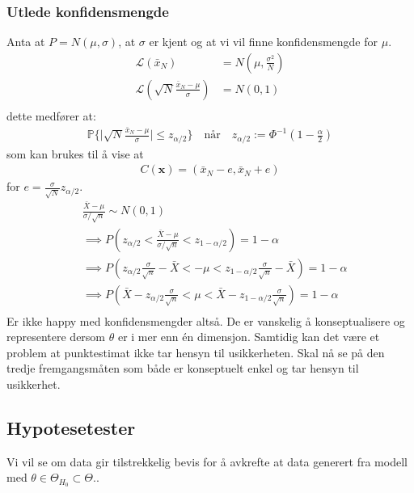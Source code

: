 \subsubsection{Utlede konfidensmengde}
Anta at $P=N(\mu,\sigma)$, at $\sigma$ er kjent og at vi vil finne konfidensmengde for $\mu$.
\begin{align}
\mathcal{L}(\bar{x}_N)&=N\left(\mu,\frac{\sigma^2}{N}\right) \\
\mathcal{L}\left(\sqrt{N}\frac{\bar{x}_N-\mu}{\sigma}\right) &= N(0,1)\\
\end{align}
dette medfører at: 
\begin{align}
\mathbb{P}\{\mid \sqrt{N}\frac{\bar{x}_N-\mu}{\sigma} \mid \leqslant z_{\alpha/2} \}\quad\text{når}\quad  z_{\alpha/2} := \Phi^{-1}\left(1-\frac{\alpha}{2}\right)
\end{align}
som kan brukes til å vise at 
\begin{align}
C(\mathbf{x})=(\bar{x}_N-e,\bar{x}_N+e)
\end{align}
for $e=\frac{\sigma}{\sqrt{N}}z_{\alpha/2}$. 
\begin{align} &\frac{\bar{X}-\mu}{\sigma/\sqrt{n}} \sim N(0,1) \\
& \implies P\left(z_{\alpha/2} < \frac{\bar{X}-\mu}{\sigma/\sqrt{n}} < z_{1-\alpha/2}\right) = 1-\alpha \\
& \implies P\left(z_{\alpha/2}\frac{\sigma}{\sqrt{n}}-\bar{X} < -\mu < z_{1-\alpha/2}\frac{\sigma}{\sqrt{n}}-\bar{X} \right) = 1-\alpha \\
& \implies P\left(\bar{X}-z_{\alpha/2}\frac{\sigma}{\sqrt{n}} < \mu < \bar{X} - z_{1-\alpha/2}\frac{\sigma}{\sqrt{n}} \right) = 1-\alpha \\
\end{align}
Er ikke happy med konfidensmengder altså. De er vanskelig å konseptualisere og representere dersom $\theta$ er i mer enn én dimensjon. Samtidig kan det være et problem at punktestimat ikke tar hensyn til usikkerheten. Skal nå se på den tredje fremgangsmåten som både er konseptuelt enkel og tar hensyn til usikkerhet.
\subsection{Hypotesetester}
Vi vil se om data gir tilstrekkelig bevis for å avkrefte at data generert fra modell med $\theta \in \Theta_{H_0} \subset \Theta$..

